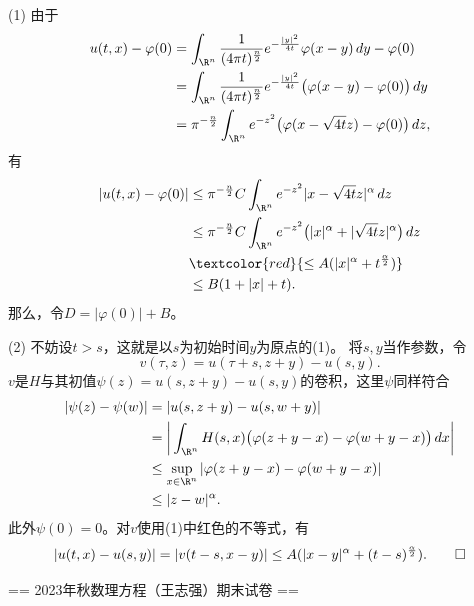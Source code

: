 \begin{proofc}[7的解答]
    (1) 由于\begin{align*}
        u(t,x)-\varphi(0)&=\int_{\R^n}\frac{1}{(4\pi t)^\frac{n}{2}}
        e^{-\frac{|y|^2}{4t}}\varphi(x-y)\,dy-\varphi(0)\\
        &=\int_{\R^n}\frac{1}{(4\pi t)^\frac{n}{2}}
        e^{-\frac{|y|^2}{4t}}\big(\varphi(x-y)-\varphi(0)\big)\,dy\\
        &=\pi^{-\frac{n}{2}}\int_{\R^n}e^{-z^2}
        \big(\varphi(x-\sqrt{4t}z)-\varphi(0)\big)\,dz,
        \end{align*}
    有\begin{align*}
        |u(t,x)-\varphi(0)|&\le \pi^{-\frac{n}{2}}C\int_{\R^n}e^{-z^2}|x-\sqrt{4t}z|^\alpha\,dz\\
        &\le \pi^{-\frac{n}{2}}C\int_{\R^n}e^{-z^2}\big(|x|^\alpha+|\sqrt{4t}z|^\alpha\big)\,dz\\
        &\textcolor{red}{\le A(|x|^\alpha+t^\frac{\alpha}{2})}\\
        &\le B(1+|x|+t).
    \end{align*}
    那么，令$D=|\varphi(0)|+B$。

    (2) 不妨设$t>s$，这就是以$s$为初始时间$y$为原点的(1)。
    将$s,y$当作参数，令
    $$v(\tau,z)=u(\tau+s,z+y)-u(s,y).$$
    $v$是$H$与其初值$\psi(z)=u(s,z+y)-u(s,y)$的卷积，这里$\psi$同样符合
    \begin{align*}
        |\psi(z)-\psi(w)|&=|u(s,z+y)-u(s,w+y)|\\
        &=\bigg|\int_{\R^n}H(s,x)\big(\varphi(z+y-x)-\varphi(w+y-x)\big)\,dx\bigg|\\
        &\le\sup_{x\in\R^n}|\varphi(z+y-x)-\varphi(w+y-x)|\\
        &\le|z-w|^\alpha.
    \end{align*}
    此外$\psi(0)=0$。对$v$使用(1)中\textcolor{FF0000}{红色的}不等式，有
    $$|u(t,x)-u(s,y)|=|v(t-s,x-y)|\le A(|x-y|^\alpha+(t-s)^\frac{\alpha}{2}).\qedhere$$
\end{proofc}

== 2023年秋数理方程（王志强）期末试卷 ==

